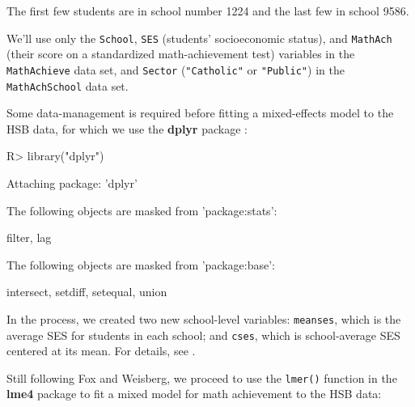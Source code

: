 \documentclass[
]{jss}
\begin{document}
The first few students are in school number 1224 and the last few in
school 9586.

We'll use only the \texttt{School}, \texttt{SES} (students'
socioeconomic status), and \texttt{MathAch} (their score on a
standardized math-achievement test) variables in the
\texttt{MathAchieve} data set, and \texttt{Sector} (\texttt{"Catholic"}
or \texttt{"Public"}) in the \texttt{MathAchSchool} data set.

Some data-management is required before fitting a mixed-effects model to
the HSB data, for which we use the \textbf{dplyr} package
\citep{WickhamEtAl:2023}:

\begin{CodeChunk}
\begin{CodeInput}
R> library("dplyr")
\end{CodeInput}
\begin{CodeOutput}

Attaching package: 'dplyr'
\end{CodeOutput}
\begin{CodeOutput}
The following objects are masked from 'package:stats':

    filter, lag
\end{CodeOutput}
\begin{CodeOutput}
The following objects are masked from 'package:base':

    intersect, setdiff, setequal, union
\end{CodeOutput}
\end{CodeChunk}

In the process, we created two new school-level variables:
\texttt{meanses}, which is the average SES for students in each school;
and \texttt{cses}, which is school-average SES centered at its mean. For
details, see \citet[Sec. 7.2.2]{FoxWeisberg:2019}.

Still following Fox and Weisberg, we proceed to use the \texttt{lmer()}
function in the \textbf{lme4} package \citep{BatesEtAl:2015} to fit a
mixed model for math achievement to the HSB data:
\end{document}
